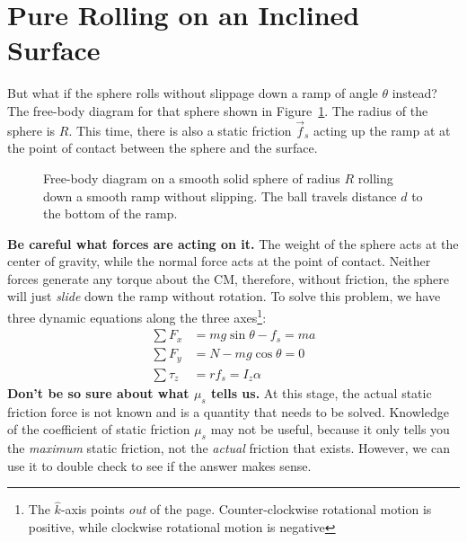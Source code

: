 \documentclass{../../oss-handout}
\newcommand{\kkk}{\hat k}
\begin{document}
\section{Pure Rolling on an Inclined Surface}
But what if the sphere rolls without slippage down a ramp of angle $\theta$
instead? The free-body diagram for that sphere shown in Figure~\ref{roll-ramp}.
The radius of the sphere is $R$. This time, there is also a static friction
$\vec f_s$ acting up the ramp at at the point of contact between the sphere and
the surface.
\begin{figure}[!ht]
  \centering
  \caption{Free-body diagram on a smooth solid sphere of radius $R$ rolling
    down a smooth ramp without slipping. The ball travels distance $d$ to the
    bottom of the ramp.}
  \label{roll-ramp}
\end{figure}

\textbf{Be careful what forces are acting on it.} The weight of the sphere acts
at the center of gravity, while the normal force acts at the point of contact.
Neither forces generate any torque about the CM, therefore, without friction,
the sphere will just \emph{slide} down the ramp without rotation. To solve this
problem, we have three dynamic equations along the three
axes\footnote{The $\kkk$-axis points \emph{out} of the page. Counter-clockwise
  rotational motion is positive, while clockwise rotational motion is negative}:
\begin{align}
  \sum F_x&=mg\sin\theta-f_s=ma\\ \label{f_x}
  \sum F_y&=N-mg\cos\theta=0\\
  \sum\tau_z&=rf_s=I_z\alpha \label{tau}
\end{align}
\textbf{Don't be so sure about what $\mu_s$ tells us.} At this stage, the
actual static friction force is not known and is a quantity that needs to be
solved. Knowledge of the coefficient of static friction $\mu_s$ may not be
useful, because it only tells you the \emph{maximum} static friction, not the
\emph{actual} friction that exists. However, we can use it to double check to
see if the answer makes sense.
\end{document}
